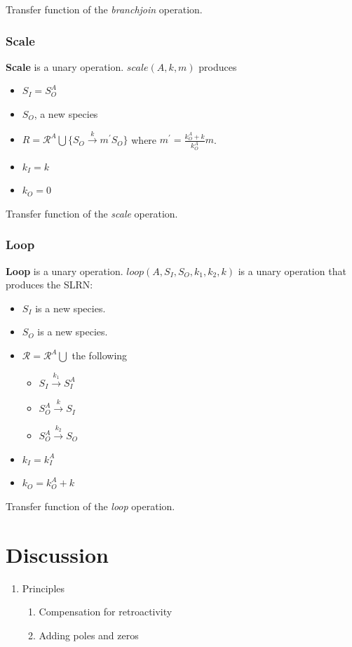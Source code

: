 \documentclass[unnumsec,webpdf,contemporary,large]{oup-authoring-template}%
\theoremstyle{thmstyleone}%
\theoremstyle{thmstyletwo}%
\theoremstyle{thmstylethree}%
\begin{document}
Transfer function of the {\em branchjoin} operation.

\subsubsection{Scale}
{\bf Scale} is a unary operation.
$scale(A, k, m)$ produces 
\begin{itemize}
\item $S_I = S^A_O$
\item $S_O$, a new species
\item $R = \mathcal{R}^A \bigcup \{S_O \xrightarrow{k} m^{\prime} S_O\}$
where $m^{\prime} = \frac{k^A_O + k}{k^A_O} m$.
\item $k_I = k$
\item $k_O = 0$
\end{itemize}

Transfer function of the {\em scale} operation.


\subsubsection{Loop}
{\bf Loop} is a unary operation.
$loop(A, S_I, S_O, k_1, k_2, k)$ is a unary operation that produces
the SLRN:
\begin{itemize}
\item $S_I$ is a new species.
\item $S_O$ is a new species.
\item $\mathcal{R} = \mathcal{R}^A \bigcup$ the following
\begin{itemize}
\item $S_I \xrightarrow{k_1} S^A_I$
\item $S^A_O \xrightarrow{k} S_I$
\item $S^A_O \xrightarrow{k_2} S_O$
\end{itemize}
\item $k_I = k^A_I$
\item $k_O = k^A_O + k$
\end{itemize}

Transfer function of the {\em loop} operation.

\section{Discussion}\label{discussion}
\begin{enumerate}

\item
Principles
\begin{enumerate}
\item
Compensation for retroactivity
\item 
Adding poles and zeros
\end{enumerate}

\end{enumerate}
\end{document}
